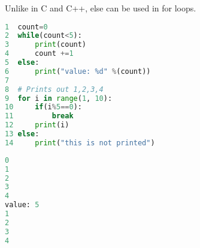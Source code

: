\documentclass[crop=false,class=book]{standalone}
\begin{document}
Unlike in C and C++, else can be used in for loops.\newline
\begin{minipage}[t]{.48\textwidth}
\centering
\begin{lstlisting}[language=python,frame=single,basicstyle=\footnotesize,frame=single,caption=input]
1  count=0
2  while(count<5):
3      print(count)
4      count +=1
5  else:
6      print("value: %d" %(count))
7
8  # Prints out 1,2,3,4
9  for i in range(1, 10):
10     if(i%5==0):
11         break
12     print(i)
13 else:
14     print("this is not printed")
\end{lstlisting}
\end{minipage}\hfill
\begin{minipage}[t]{.48\textwidth}
\centering
\begin{lstlisting}[language=python,frame=single,basicstyle=\footnotesize,frame=single,caption=output]
0
1
2
3
4
value: 5
1
2
3
4
\end{lstlisting}
\end{minipage}
\end{document}
